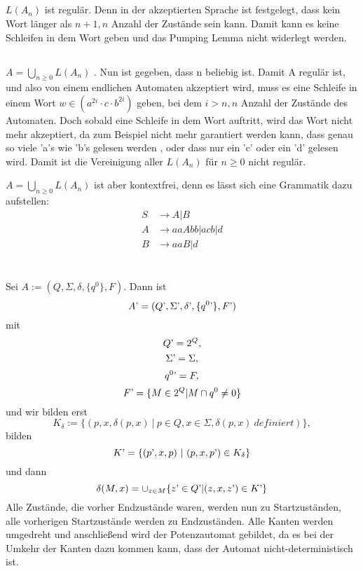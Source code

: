 \documentclass{article}
\begin{document}
\subsection{}

$L(A_n)$ ist regulär. Denn in der akzeptierten Sprache ist
festgelegt, dass kein Wort länger als $n + 1, n$ Anzahl der Zustände
sein kann. Damit kann es keine Schleifen in dem Wort geben und das
Pumping Lemma nicht widerlegt werden.

 \subsection{}
 
 $A = \bigcup_{n \geq 0} L(A_n)$ . Nun ist gegeben, dass n beliebig
ist. Damit A regulär ist, und also von einem endlichen Automaten
akzeptiert wird, muss es eine Schleife in einem Wort $w \in
(a^{2i}\cdot c\cdot b^{2i})$ geben, bei dem $i > n, n$ Anzahl der
Zustände des Automaten. Doch sobald eine Schleife in dem Wort auftritt, 
wird das Wort nicht mehr akzeptiert, da zum Beispiel nicht mehr garantiert werden kann, dass genau so viele 'a's wie 'b's gelesen werden , oder dass nur ein 'c' oder ein 'd' gelesen wird. Damit ist die Vereinigung aller $L(A_n)$ für $n \geq 0$ nicht regulär. 

 $A = \bigcup_{n \geq 0} L(A_n)$ ist aber kontextfrei, denn es lässt sich eine Grammatik dazu aufstellen:
\begin{align*}
 S &\rightarrow A | B \\
 A &\rightarrow aaAbb | acb | d \\
 B &\rightarrow aaB | d 
\end{align*}
 
\section{}
\subsection{}

Sei $A := (Q, \Sigma, \delta, \{q^0\}, F)$. 
Dann ist \[ A\textrm' = (Q\textrm', \Sigma\textrm', 
\delta\textrm', \{q^0\textrm'\},F\textrm') \]
mit \[ Q\textrm' = 2^Q,\]\[ \Sigma\textrm' = \Sigma,\] 
\[ q^0\textrm' = F,\] \[ F\textrm' = \{M \in 2^Q | M \cap q^0 \neq 0\} \] und wir bilden erst
\[K_\delta := \{ (p,x, \delta(p,x)~|~p \in Q, x \in \Sigma, \delta(p,x)~ definiert)\},\]
bilden \[K\textrm'= \{(p\textrm',x,p)~|~ (p,x,p\textrm') \in K_\delta\}\] und dann
\[\delta(M,x)= \cup_{z\in M} \{z\textrm' \in Q\textrm' | (z,x,z\textrm') \in K\textrm'\}\]
Alle Zustände, die vorher Endzustände waren, werden nun zu Startzuständen, alle vorherigen Startzustände werden
zu Endzuständen. Alle Kanten werden umgedreht und anschließend wird der Potenzautomat gebildet, da es bei der
Umkehr der Kanten dazu kommen kann, dass der Automat nicht-deterministisch ist. 
  
\end{document}

